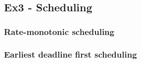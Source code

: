 \subsection{Ex3 - Scheduling}

\subsubsection{Rate-monotonic scheduling}

\subsubsection{Earliest deadline first scheduling}
